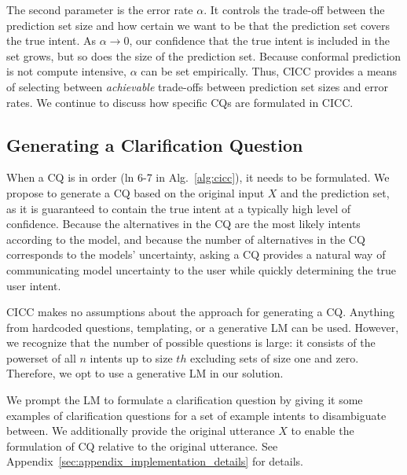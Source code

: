 \documentclass[11pt]{article}
\begin{document}
The second parameter is the error rate $\alpha$. It controls the trade-off between the prediction set size and how certain we want to be that the prediction set covers the true intent. As $\alpha \to 0$, our confidence that the true intent is included in the set grows, but so does the size of the prediction set. Because conformal prediction is not compute intensive, $\alpha$ can be set empirically. Thus, CICC provides a means of selecting between \emph{achievable} trade-offs between prediction set sizes and error rates. We continue to discuss how specific CQs are formulated in CICC.

\subsection{Generating a Clarification Question}
When a CQ is in order (ln 6-7 in Alg.~\ref{alg:cicc}), it needs to be formulated. We propose to generate a CQ based on the original input $X$ and the prediction set, as it is guaranteed to contain the true intent at a typically high level of confidence. Because the alternatives in the CQ are the most likely intents according to the model, and because the number of alternatives in the CQ corresponds to the models' uncertainty, asking a CQ provides a natural way of communicating model uncertainty to the user while quickly determining the true user intent.

CICC makes no assumptions about the approach for generating a CQ. Anything from hardcoded questions, templating, or a generative LM can be used. However, we recognize that the number of possible questions is large: it consists of the powerset of all $n$ intents up to size $th$ excluding sets of size one and zero. Therefore, we opt to use a generative LM in our solution.

We prompt the LM to formulate a clarification question by giving it some examples of clarification questions for a set of example intents to disambiguate between. We additionally provide the original utterance $X$ to enable the formulation of CQ relative to the original utterance. See Appendix~\ref{sec:appendix_implementation_details} for details.

\end{document}
